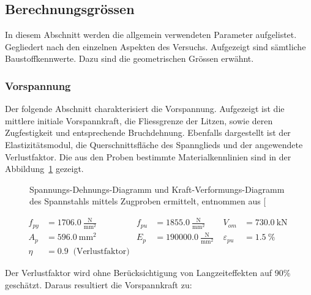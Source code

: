 \documentclass[
  11pt,
  letterpaper,
]{scrreprt}
\begin{document}
\subsection{Berechnungsgrössen}\label{berechnungsgruxf6ssen}

In diesem Abschnitt werden die allgemein verwendeten Parameter
aufgelistet. Gegliedert nach den einzelnen Aspekten des Versuchs.
Aufgezeigt sind sämtliche Baustoffkennwerte. Dazu sind die geometrischen
Grössen erwähnt.

\subsubsection{Vorspannung}\label{vorspannung}

Der folgende Abschnitt charakterisiert die Vorspannung. Aufgezeigt ist
die mittlere initiale Vorspannkraft, die Fliessgrenze der Litzen, sowie
deren Zugfestigkeit und entsprechende Bruchdehnung. Ebenfalls
dargestellt ist der Elastizitätsmodul, die Querschnittsfläche des
Spannglieds und der angewendete Verlustfaktor. Die aus den Proben
bestimmte Materialkennlinien sind in der
Abbildung~\ref{fig-sigma_eps_spannstahl} gezeigt.

\begin{figure}[H]


\caption{\label{fig-sigma_eps_spannstahl}Spannungs-Dehnungs-Diagramm und
Kraft-Verformungs-Diagramm des Spannstahls mittels Zugproben ermittelt,
entnommen aus {[}\citeproc{ref-sigrist_versuche_1993}{5}{]}}

\end{figure}%

$$
\begin{aligned}
f_{py} &= 1706.0\ \frac{\mathrm{N}}{\mathrm{mm}^{2}} \; 
 &f_{pu} &= 1855.0\ \frac{\mathrm{N}}{\mathrm{mm}^{2}} \; 
 &V_{om} &= 730.0\ \mathrm{kN} \; 
\\[10pt]
 A_{p} &= 596.0\ \mathrm{mm}^{2} \; 
 &E_{p} &= 190000.0\ \frac{\mathrm{N}}{\mathrm{mm}^{2}} \; 
 &\varepsilon_{pu} &= 1.5\ \mathrm{\%} \; 
\\[10pt]
 \eta &= 0.9 \; \;\textrm{(Verlustfaktor)}
\end{aligned}
$$

Der Verlustfaktor wird ohne Berücksichtigung von Langzeiteffekten auf
90\% geschätzt. Daraus resultiert die Vorspannkraft zu:
\end{document}
